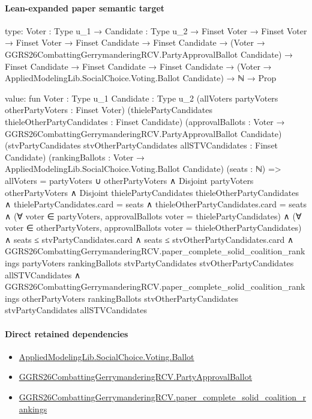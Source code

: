 \documentclass[10pt]{article}
\begin{document}
\paragraph{Lean-expanded paper semantic target}
\begin{ReviewVerbatim}
type:
{Voter : Type u_1} →
  {Candidate : Type u_2} →
    Finset Voter →
      Finset Voter →
        Finset Voter →
          Finset Candidate →
            Finset Candidate →
              (Voter → GGRS26CombattingGerrymanderingRCV.PartyApprovalBallot Candidate) →
                Finset Candidate →
                  Finset Candidate →
                    Finset Candidate → (Voter → AppliedModelingLib.SocialChoice.Voting.Ballot Candidate) → ℕ → Prop

value:
fun {Voter : Type u_1} {Candidate : Type u_2} (allVoters partyVoters otherPartyVoters : Finset Voter)
    (thielePartyCandidates thieleOtherPartyCandidates : Finset Candidate)
    (approvalBallots : Voter → GGRS26CombattingGerrymanderingRCV.PartyApprovalBallot Candidate)
    (stvPartyCandidates stvOtherPartyCandidates allSTVCandidates : Finset Candidate)
    (rankingBallots : Voter → AppliedModelingLib.SocialChoice.Voting.Ballot Candidate) (seats : ℕ) =>
  allVoters = partyVoters ∪ otherPartyVoters ∧
    Disjoint partyVoters otherPartyVoters ∧
      Disjoint thielePartyCandidates thieleOtherPartyCandidates ∧
        thielePartyCandidates.card = seats ∧
          thieleOtherPartyCandidates.card = seats ∧
            (∀ voter ∈ partyVoters, approvalBallots voter = thielePartyCandidates) ∧
              (∀ voter ∈ otherPartyVoters, approvalBallots voter = thieleOtherPartyCandidates) ∧
                seats ≤ stvPartyCandidates.card ∧
                  seats ≤ stvOtherPartyCandidates.card ∧
                    GGRS26CombattingGerrymanderingRCV.paper_complete_solid_coalition_rankings partyVoters rankingBallots
                        stvPartyCandidates stvOtherPartyCandidates allSTVCandidates ∧
                      GGRS26CombattingGerrymanderingRCV.paper_complete_solid_coalition_rankings otherPartyVoters
                        rankingBallots stvOtherPartyCandidates stvPartyCandidates allSTVCandidates
\end{ReviewVerbatim}

\paragraph{Direct retained dependencies}
\begin{itemize}\raggedright
\item \hyperlink{governing-declaration-4c0320b08e4fb484}{Applied\allowbreak{}Modeling\allowbreak{}Lib.\allowbreak{}Social\allowbreak{}Choice.\allowbreak{}Voting.\allowbreak{}Ballot}
\item \hyperlink{governing-declaration-3adeede1bc778473}{GGRS26\allowbreak{}Combatting\allowbreak{}Gerrymandering\allowbreak{}RCV.\allowbreak{}Party\allowbreak{}Approval\allowbreak{}Ballot}
\item \hyperlink{paper-prerequisite-a48f905958044eb5}{GGRS26\allowbreak{}Combatting\allowbreak{}Gerrymandering\allowbreak{}RCV.\allowbreak{}paper\_\allowbreak{}complete\_\allowbreak{}solid\_\allowbreak{}coalition\_\allowbreak{}rankings}
\end{itemize}
\end{document}
